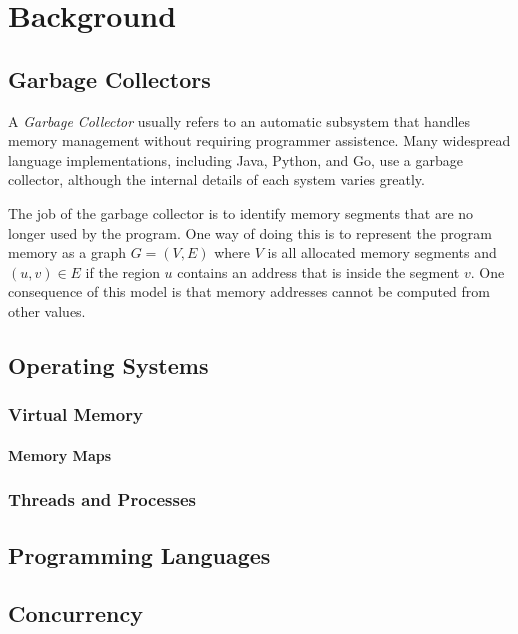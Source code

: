 \chapter{Background}


\section{Garbage Collectors}

A \emph{Garbage Collector} usually refers to an automatic subsystem that handles memory management
without requiring programmer assistence. Many widespread language implementations,
including Java, Python, and Go, use a garbage collector, although the internal details of each
system varies greatly.

The job of the garbage collector is to identify memory segments that are no longer used by the
program. One way of doing this is to represent the program memory as a graph $G=(V, E)$ where $V$ is
all allocated memory segments and $(u, v) \in E$ if the region $u$ contains an address that is
inside the segment $v$. One consequence of this model is that memory addresses cannot be computed
from other values.


\section{Operating Systems}
\blindtext{}

\subsection{Virtual Memory}
\blindtext{}

\subsubsection{Memory Maps\label{sec:memory-map}}
\blindtext{}


\subsection{Threads and Processes}
\blindtext{}


\section{Programming Languages}
\blindtext{}


\section{Concurrency}
\blindtext{}

